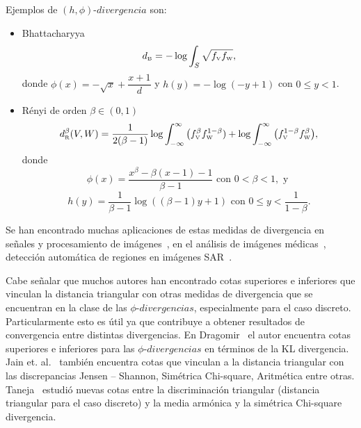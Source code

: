 \begin{example} Ejemplos de $\left(h,\phi\right) \text{-} divergencia$ son:
	\begin{itemize}
		\item Bhattacharyya 
		\begin{align}
		\label{Bhattacharyya}
		d_{\text{\tiny{B}}}=-\log \displaystyle \int_{S} \sqrt{f_\text{\tiny{V}}f_\text{\tiny{W}}},
		\end{align}
		donde $\phi(x)=-\sqrt{x}+\dfrac{x+1}{d}$ y $h(y)=-\log(-y+1)$ con $0\leq y<1$.
		\item R\'enyi de orden $\beta\in(0,1)$ 
		\begin{align}
		d_\text{\tiny{R}}^{\beta}(V,W)=\frac{1}{2(\beta-1)}\log\int_{-\infty}^{\infty}\big({f_\text{\tiny{V}}^{\beta}f_\text{\tiny{W}}^{1-\beta})+\log\int_{-\infty}^{\infty}\big(f_\text{\tiny{V}}^{1-\beta}f_\text{\tiny{W}}^{\beta}}\big),
		\end{align}
		donde 
		$$\phi(x)=\dfrac{x^{\beta}-\beta(x-1)-1}{\beta-1} \text{ con } 0 < \beta < 1, \text{ y }$$  
		$$h(y)=\dfrac{1}{\beta-1}\log((\beta-1)y+1) \text{ con } 0\leq y<\dfrac{1}{1-\beta}.$$
	\end{itemize}
\end{example}

Se han encontrado muchas aplicaciones de estas medidas de divergencia en señales y procesamiento de imágenes~\cite{Aviyente2007}, en el análisis de imágenes médicas~\cite{5599869}, detección automática de regiones en imágenes SAR~\cite{ClassificationPolSARSegmentsMinimizationWishartDistances,EdgeDetectionDistancesEntropiesJSTARS,SARSegmentationLevelSetGA0}. 

Cabe señalar que muchos autores han encontrado cotas superiores e inferiores que vinculan la distancia triangular con otras medidas de divergencia que se encuentran en la clase de las $\phi \text{-} divergencias$, especialmente para el caso discreto. Particularmente esto es útil ya que contribuye a obtener resultados de convergencia entre distintas divergencias. En Dragomir~\cite{Dragomir2002} el autor encuentra cotas superiores e inferiores para las $\phi \text{-} divergencias$ en términos de la KL divergencia. Jain et. al.~\cite{JainSrivastava2007} también encuentra cotas que vinculan a la distancia triangular con las discrepancias Jensen – Shannon, Simétrica Chi-square, Aritmética entre otras. Taneja~\cite{Taneja2006} estudió nuevas cotas entre la discriminación triangular (distancia triangular para el caso discreto) y la media armónica y la simétrica Chi-square divergencia.

